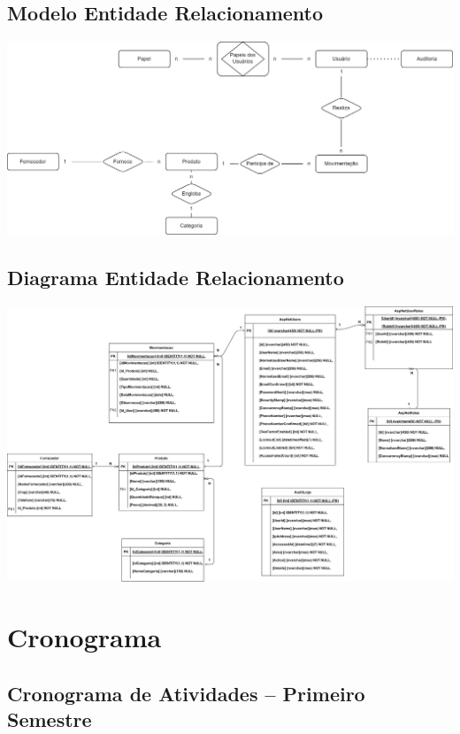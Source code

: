 \documentclass[
	12pt,				%
	openany,			%
	twoside,			%
	a4paper,			%
	english,			%
	brazil				%
	]{abntex2}
\begin{document}
\subsection{Modelo Entidade Relacionamento}

\includegraphics[width=1.0\textwidth]{Figuras/MERestoque.png}


\subsection{Diagrama Entidade Relacionamento}

\includegraphics[width=1.0\textwidth]{Figuras/DERestoque.png}



\section{Cronograma}

\subsection{Cronograma de Atividades – Primeiro Semestre}
\end{document}
